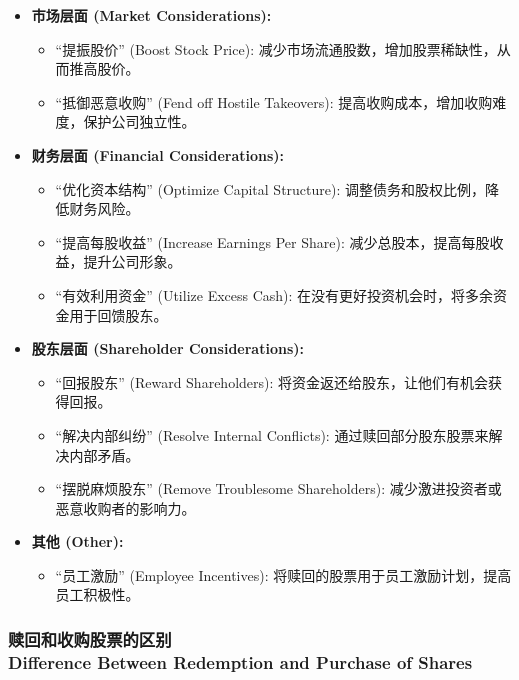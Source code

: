 \documentclass{article}
\begin{document}
\begin{itemize}[labelindent=1cm]
\item \textbf{市场层面 (Market Considerations):}
    \begin{itemize}
        \item \enquote{提振股价} (Boost Stock Price): 减少市场流通股数，增加股票稀缺性，从而推高股价。
        \item \enquote{抵御恶意收购} (Fend off Hostile Takeovers): 提高收购成本，增加收购难度，保护公司独立性。
    \end{itemize}
\item \textbf{财务层面 (Financial Considerations):}
    \begin{itemize}
        \item \enquote{优化资本结构} (Optimize Capital Structure): 调整债务和股权比例，降低财务风险。
        \item \enquote{提高每股收益} (Increase Earnings Per Share): 减少总股本，提高每股收益，提升公司形象。
        \item \enquote{有效利用资金} (Utilize Excess Cash): 在没有更好投资机会时，将多余资金用于回馈股东。
    \end{itemize}
\item \textbf{股东层面 (Shareholder Considerations):}
    \begin{itemize}
        \item \enquote{回报股东} (Reward Shareholders): 将资金返还给股东，让他们有机会获得回报。
        \item \enquote{解决内部纠纷} (Resolve Internal Conflicts): 通过赎回部分股东股票来解决内部矛盾。
        \item \enquote{摆脱麻烦股东} (Remove Troublesome Shareholders): 减少激进投资者或恶意收购者的影响力。
    \end{itemize}
\item \textbf{其他 (Other):}
    \begin{itemize}
        \item \enquote{员工激励} (Employee Incentives): 将赎回的股票用于员工激励计划，提高员工积极性。
    \end{itemize}
\end{itemize}

\subsubsection{赎回和收购股票的区别\\Difference Between Redemption and Purchase of Shares}
\end{document}
